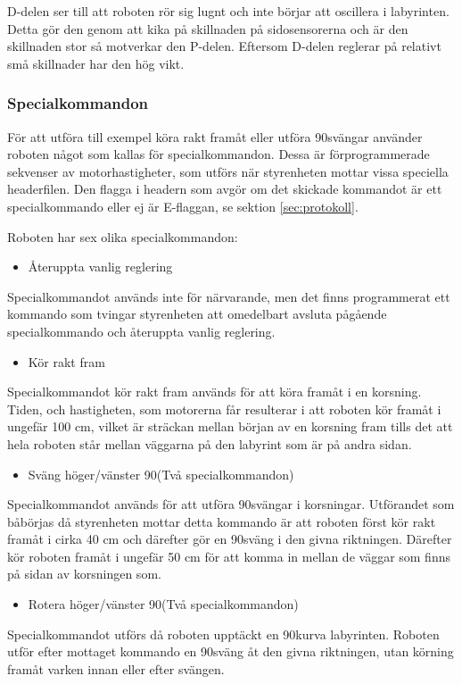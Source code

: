 D-delen ser till att roboten rör sig lugnt och inte börjar att oscillera i
labyrinten. Detta gör den genom att kika på skillnaden på sidosensorerna och är
den skillnaden stor så motverkar den P-delen. Eftersom D-delen reglerar på
relativt små skillnader har den hög vikt.
\label{reglering}

\subsubsection{Specialkommandon}
För att utföra till exempel köra rakt framåt eller utföra 90\degree svängar använder
roboten något som kallas för specialkommandon. Dessa är förprogrammerade 
sekvenser av motorhastigheter, som utförs när styrenheten mottar vissa speciella
headerfilen. Den flagga i headern som avgör om det skickade kommandot är ett
specialkommando eller ej är E-flaggan, se sektion \ref{sec:protokoll}.

Roboten har sex olika specialkommandon:

 \begin{itemize}
\item Återuppta vanlig reglering
\end{itemize}
Specialkommandot används inte för närvarande, men det finns programmerat ett
kommando som tvingar styrenheten att omedelbart avsluta pågående specialkommando
och återuppta vanlig reglering.

\begin{itemize}
\item Kör rakt fram
\end{itemize}
Specialkommandot kör rakt fram används för att köra framåt i en korsning. Tiden, och hastigheten,
 som motorerna får resulterar i att roboten kör framåt  i ungefär 100 cm, vilket är sträckan mellan 
 början av en korsning fram tills det att hela roboten står mellan väggarna på den labyrint som är 
 på andra sidan.
 
 \begin{itemize}
\item Sväng höger/vänster 90\degree (Två specialkommandon) 
\end{itemize}
Specialkommandot används för att utföra 90\degree  svängar i korsningar. Utförandet som båbörjas
då styrenheten mottar detta kommando är att roboten först kör rakt framåt i cirka 40 cm och därefter
gör en 90\degree sväng i den givna riktningen. Därefter kör roboten framåt i ungefär 50 cm för 
att komma in mellan de väggar som finns på sidan av korsningen som.

 \begin{itemize}
\item Rotera höger/vänster 90\degree (Två specialkommandon) 
\end{itemize}
Specialkommandot utförs då roboten upptäckt en 90\degree  kurva labyrinten. Roboten utför efter 
mottaget kommando en 90\degree sväng åt den givna riktningen, utan körning framåt varken innan 
eller efter svängen.


